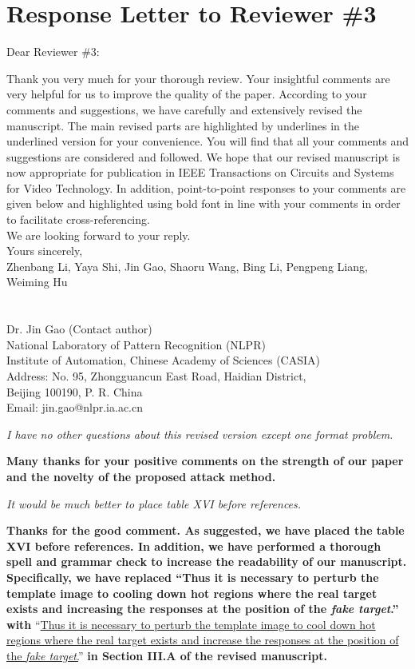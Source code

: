 \documentclass[12pt]{article}
\begin{document}
\clearpage
\newpage
{\centering\section*{Response Letter to Reviewer \#3}}
\noindent Dear Reviewer \#3:

Thank you very much for your thorough review. Your insightful comments are very helpful for us to improve the quality of the paper. According to your comments and suggestions, we have carefully and extensively revised the manuscript. The main revised parts are highlighted by underlines in the underlined version for your convenience. You will find that all your comments and suggestions are considered and followed. We hope that our revised manuscript is now appropriate for publication in IEEE Transactions on Circuits and Systems for Video Technology.
In addition, point-to-point responses to your comments are given below and highlighted using bold font in line with your comments in order to facilitate cross-referencing.\\[10pt]
\indent We are looking forward to your reply.\\[10pt]
\noindent Yours sincerely,\\
\noindent Zhenbang Li, Yaya Shi, Jin Gao, Shaoru Wang, Bing Li, Pengpeng Liang, Weiming Hu
\\
\\
\\
\noindent Dr. Jin Gao (Contact author)\\
\noindent National Laboratory of Pattern Recognition (NLPR)\\
\noindent Institute of Automation, Chinese Academy of Sciences (CASIA)\\
\noindent Address: No. 95, Zhongguancun East Road, Haidian District,\\
\noindent Beijing 100190, P. R. China\\
\noindent Email: jin.gao@nlpr.ia.ac.cn

\newpage

\textit{I have no other questions about this revised version except one format problem.}

\textbf{Many thanks for your positive comments on the strength of our paper and the novelty of the proposed attack method.}

\textit{It would be much better to place table XVI before references.}

\textbf{Thanks for the good comment. As suggested, we have placed the table XVI before references. In addition, we have performed a thorough spell and grammar check to increase the readability of our manuscript. Specifically, we have replaced ``Thus it is necessary to perturb the template image to cooling down hot regions where the real target exists and increasing the responses at the position of the \textit{fake target}.'' with} ``\uline{Thus it is necessary to perturb the template image to cool down hot regions where the real target exists and increase the responses at the position of the \textit{fake target}.}''
\textbf{in Section III.A of the revised manuscript.}
\end{document}
